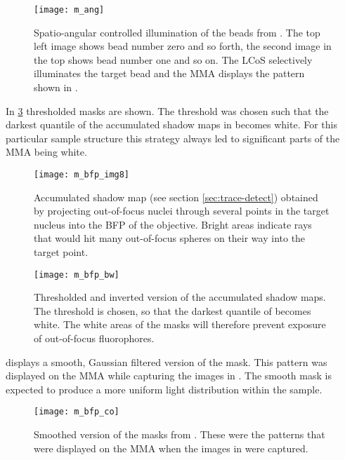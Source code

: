 \begin{figure}[H]
  \centering
  \texttt{[image: m\_ang]}
  \caption{Spatio-angular controlled illumination of the beads from
    . The top left image shows bead number zero and
    so forth, the second image in the top shows bead number one and so
    on. The LCoS selectively illuminates the target bead and the MMA
    displays the pattern shown in .}
  \label{fig:m_ang}
\end{figure}


In \ref{fig:m_bfp_bw} thresholded masks are shown. The threshold was
chosen such that the darkest quantile of the accumulated shadow maps
in  becomes white. For this particular sample
structure this strategy always led to significant parts of the MMA
being white.

\begin{figure}[H]
  \centering
  \texttt{[image: m\_bfp\_img8]}
  \caption{Accumulated shadow map (see section \ref{sec:trace-detect})
    obtained by projecting out-of-focus nuclei through several points
    in the target nucleus into the BFP of the objective. Bright areas
    indicate rays that would hit many out-of-focus spheres on their
    way into the target point.}
  \label{fig:m_bfp_img8}
\end{figure}

\begin{figure}[H]
  \centering
  \texttt{[image: m\_bfp\_bw]}
  \caption{Thresholded and inverted version of the accumulated shadow
    maps. The threshold is chosen, so that the darkest quantile of
     becomes white. The white areas of the
    masks will therefore prevent exposure of out-of-focus
    fluorophores.}
  \label{fig:m_bfp_bw}
\end{figure}

 displays a smooth, Gaussian filtered version of
the mask. This pattern was displayed on the MMA while capturing the
images in . The smooth mask is expected to
produce a more uniform light distribution within the sample.


\begin{figure}[H]
  \centering
  \texttt{[image: m\_bfp\_co]}
  \caption{Smoothed version of the masks from
    . These were the patterns that were displayed
    on the MMA when the images in  were captured.}
  \label{fig:m_bfp_co}
\end{figure}


